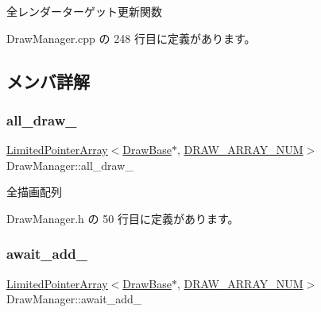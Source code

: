 全レンダーターゲット更新関数 



 Draw\+Manager.\+cpp の 248 行目に定義があります。



\subsection{メンバ詳解}
\mbox{\label{class_draw_manager_a328d73b404a5609d3e89a299362253fd}} 
\subsubsection{\texorpdfstring{all\+\_\+draw\+\_\+}{all\_draw\_}}
{\footnotesize\ttfamily \mbox{\hyperlink{class_limited_pointer_array}{Limited\+Pointer\+Array}}$<$\mbox{\hyperlink{class_draw_base}{Draw\+Base}}$\ast$, \mbox{\hyperlink{class_draw_manager_ad4326cddcb1cc4cec198c4f8069b81f0}{D\+R\+A\+W\+\_\+\+A\+R\+R\+A\+Y\+\_\+\+N\+UM}}$>$ Draw\+Manager\+::all\+\_\+draw\+\_\+\hspace{0.3cm}{\ttfamily [private]}}



全描画配列 



 Draw\+Manager.\+h の 50 行目に定義があります。

\mbox{\label{class_draw_manager_aa6a8468dd4469cde2cf162b91a5c1faf}} 
\subsubsection{\texorpdfstring{await\+\_\+add\+\_\+}{await\_add\_}}
{\footnotesize\ttfamily \mbox{\hyperlink{class_limited_pointer_array}{Limited\+Pointer\+Array}}$<$\mbox{\hyperlink{class_draw_base}{Draw\+Base}}$\ast$, \mbox{\hyperlink{class_draw_manager_ad4326cddcb1cc4cec198c4f8069b81f0}{D\+R\+A\+W\+\_\+\+A\+R\+R\+A\+Y\+\_\+\+N\+UM}}$>$ Draw\+Manager\+::await\+\_\+add\+\_\+\hspace{0.3cm}{\ttfamily [private]}}



